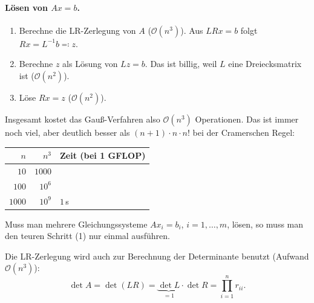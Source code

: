\documentclass[11pt]{article}
\begin{document}
\paragraph{Lösen von $Ax = b$.}
\begin{enumerate}
  \item Berechne die LR-Zerlegung von $A$ ($\mathcal{O}(n^3)$). Aus $LRx = b$ folgt $Rx = L^{-1} b \eqqcolon z$.
  \item Berechne $z$ als Lösung von $Lz = b$. Das ist billig, weil $L$ eine Dreiecksmatrix ist ($\mathcal{O}(n^2)$).
  \item Löse $Rx = z$ ($\mathcal{O}(n^2)$).
\end{enumerate}
\begin{ergaenzung}
Insgesamt kostet das Gauß-Verfahren also $\mathcal{O}(n^3)$ Operationen. Das ist immer noch viel, aber deutlich besser als $(n+1) \cdot n \cdot n!$ bei der Cramerschen Regel:
\begin{center}
  \begin{tabular}{rrl}
    $n$ & $n^3$ & Zeit (bei 1 GFLOP) \\ \hline
    $10$ & $1000$ & \\
    $100$ & $10^6$ & \\
    $1000$ & $10^9$ & $1$\,s
  \end{tabular}
\end{center}
Muss man mehrere Gleichungssysteme $A x_i = b_i$, $i = 1, \dots, m$, lösen, so muss man den teuren Schritt (1) nur einmal ausführen.
\end{ergaenzung}

Die LR-Zerlegung wird auch zur Berechnung der Determinante benutzt (Aufwand $\mathcal{O}(n^3)$):
\[ \det A = \det(LR) = \underbrace{\det L}_{= 1} \cdot \det R = \prod_{i=1}^{n} r_{ii}. \]
\end{document}
